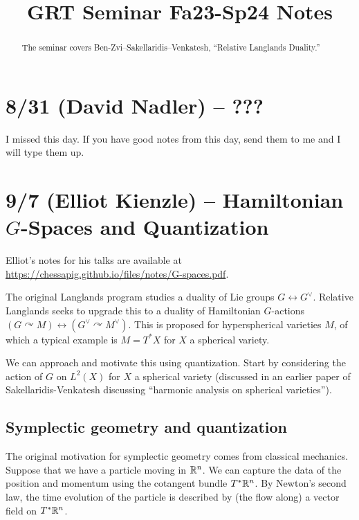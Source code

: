 \documentclass{article}
\title{GRT Seminar Fa23-Sp24 Notes}
\begin{document}
\maketitle

\begin{abstract}
	The seminar covers Ben-Zvi--Sakellaridis--Venkatesh, ``Relative Langlands Duality.''
\end{abstract}

\tableofcontents

\section{8/31 (David Nadler) -- ???}

I missed this day.
If you have good notes from this day, send them to me and I will type them up.

\section{9/7 (Elliot Kienzle) -- Hamiltonian $G$-Spaces and Quantization}

Elliot's notes for his talks are available at \url{https://chessapig.github.io/files/notes/G-spaces.pdf}.

The original Langlands program studies a duality of Lie groups $G \leftrightarrow G^\vee$.
Relative Langlands seeks to upgrade this to a duality of Hamiltonian $G$-actions $(G \curvearrowright M) \leftrightarrow (G^\vee \curvearrowright M^\vee)$.
This is proposed for hyperspherical varieties $M$, of which a typical example is $M = T^* X$ for $X$ a spherical variety.

We can approach and motivate this using quantization.
Start by considering the action of $G$ on $L^2(X)$ for $X$ a spherical variety (discussed in an earlier paper of Sakellaridis-Venkatesh discussing ``harmonic analysis on spherical varieties'').

\subsection{Symplectic geometry and quantization}

The original motivation for symplectic geometry comes from classical mechanics.
Suppose that we have a particle moving in $\mathbb{R}^n$.
We can capture the data of the position and momentum using the cotangent bundle $T^* \mathbb{R}^n$.
By Newton's second law, the time evolution of the particle is described by (the flow along) a vector field on $T^* \mathbb{R}^n$.
\end{document}
